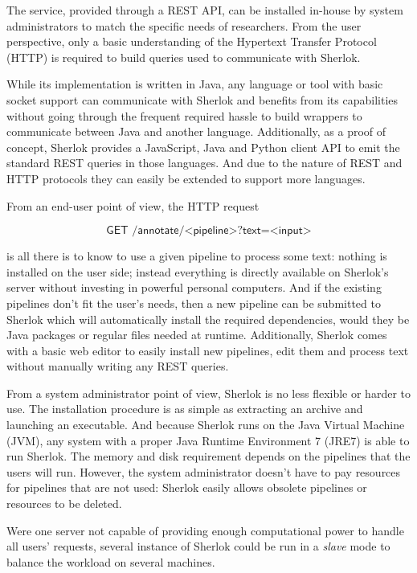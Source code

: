 \documentclass{article}
\newcommand{\REST}[1]{\textsf{#1}}
\begin{document}
The service, provided through a REST API, can be installed in-house by system administrators to
match the specific needs of researchers. From the user perspective, only a basic understanding of
the Hypertext Transfer Protocol (HTTP) is required to build queries used to communicate with
Sherlok.

While its implementation is written in Java, any language or tool with basic socket support can
communicate with Sherlok and benefits from its capabilities without going through the frequent
required hassle to build wrappers to communicate between Java and another language. Additionally,
as a proof of concept, Sherlok provides a JavaScript, Java and Python client API to emit the
standard REST queries in those languages. And due to the nature of REST and HTTP protocols they can
easily be extended to support more languages.

From an end-user point of view, the HTTP request

\[
    \REST{GET /annotate/<pipeline>?text=<input>}
\]

is all there is to know to use a given pipeline to process some text: nothing is installed on the
user side; instead everything is directly available on Sherlok's server without investing in
powerful personal computers. And if the existing pipelines don't fit the user's needs, then a new
pipeline can be submitted to Sherlok which will automatically install the required dependencies,
would they be Java packages or regular files needed at runtime. Additionally, Sherlok comes with a
basic web editor to easily install new pipelines, edit them and process text without manually
writing any REST queries.

From a system administrator point of view, Sherlok is no less flexible or harder to use. The
installation procedure is as simple as extracting an archive and launching an executable. And
because Sherlok runs on the Java Virtual Machine (JVM), any system with a proper Java Runtime
Environment 7 (JRE7) is able to run Sherlok. The memory and disk requirement depends on the
pipelines that the users will run. However, the system administrator doesn't have to pay resources
for pipelines that are not used: Sherlok easily allows obsolete pipelines or resources to be
deleted.

Were one server not capable of providing enough computational power to handle all users' requests,
several instance of Sherlok could be run in a \emph{slave} mode to balance the workload on several
machines.
\end{document}
